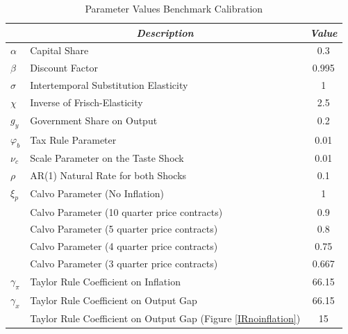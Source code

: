 \documentclass[12pt,a4paper,oneside,titlepage]{article}
\begin{document}
\pagebreak[4]




\newpage

\begin{table}[th]
\centering
\caption{Parameter Values Benchmark Calibration}
\bigskip
\bgroup
\def\arraystretch{1.5}
\begin{tabular}{p{1.2cm} l c}
\toprule\toprule \noalign{\smallskip}
 & \multicolumn{1}{c}{\textit{Description}} & \textit{Value} \\
\hline\noalign{\smallskip}

$\alpha$ & Capital Share   & 0.3 \\
$\beta$  & Discount Factor & 0.995 \\
$\sigma$ & Intertemporal Substitution Elasticity & 1 \\
$\chi$ & Inverse of Frisch-Elasticity & 2.5 \\
$g_y$ & Government Share on Output & 0.2 \\
$\varphi_b$ & Tax Rule Parameter & 0.01 \\
$\nu_c$ & Scale Parameter on the Taste Shock & 0.01 \\
$\rho$ & AR(1) Natural Rate for both Shocks & 0.1 \\
$\xi_p$ & Calvo Parameter (No Inflation) & 1 \\
 & Calvo Parameter (10 quarter price contracts) & 0.9 \\
 & Calvo Parameter (5  quarter price contracts) & 0.8 \\
 & Calvo Parameter (4  quarter price contracts) & 0.75 \\
 & Calvo Parameter (3  quarter price contracts) & 0.667 \\
$\gamma_{\pi}$ & Taylor Rule Coefficient on Inflation & 66.15 \\
$\gamma_x$ & Taylor Rule Coefficient on Output Gap & 66.15 \\
 & Taylor Rule Coefficient on Output Gap (Figure \ref{IRnoinflation}) & 15 \\
\bottomrule
\end{tabular}
\egroup
\label{tab:Tabel1}
\end{table}
\end{document}
